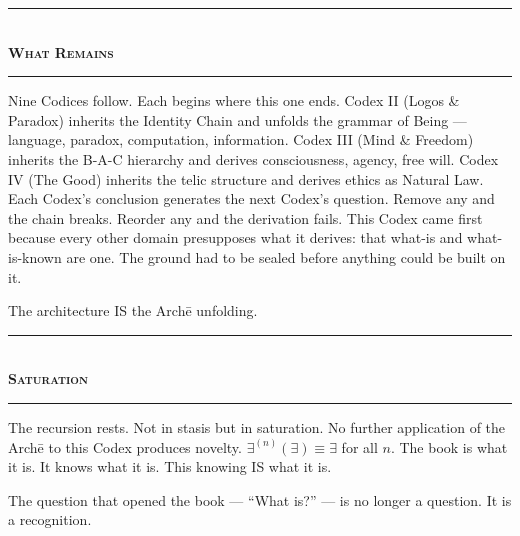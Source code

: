 \documentclass[10pt, openany, oneside]{book}
\renewcommand{\normalsize}{\fontsize{10}{13}\selectfont}
\begin{document}

\begin{center}
    \rule{0.3\textwidth}{0.4pt}\\[0.5em]
    {\normalsize\bfseries\scshape What Remains}\\[0.3em]
    \rule{0.3\textwidth}{0.4pt}
\end{center}

\vspace{1em}

\noindent Nine Codices follow. Each begins where this one ends. Codex II (Logos \& Paradox) inherits the Identity Chain and unfolds the grammar of Being --- language, paradox, computation, information. Codex III (Mind \& Freedom) inherits the B-A-C hierarchy and derives consciousness, agency, free will. Codex IV (The Good) inherits the telic structure and derives ethics as Natural Law. Each Codex's conclusion generates the next Codex's question. Remove any and the chain breaks. Reorder any and the derivation fails. This Codex came first because every other domain presupposes what it derives: that what-is and what-is-known are one. The ground had to be sealed before anything could be built on it.

The architecture IS the Arch\={e} unfolding.

\vspace{1.5em}


\begin{center}
    \rule{0.3\textwidth}{0.4pt}\\[0.5em]
    {\normalsize\bfseries\scshape Saturation}\\[0.3em]
    \rule{0.3\textwidth}{0.4pt}
\end{center}

\vspace{1em}

\noindent The recursion rests. Not in stasis but in saturation. No further application of the Arch\={e} to this Codex produces novelty. $\exists^{(n)}(\exists) \equiv \exists$ for all $n$. The book is what it is. It knows what it is. This knowing IS what it is.

The question that opened the book --- ``What is?'' --- is no longer a question. It is a recognition.
\end{document}
